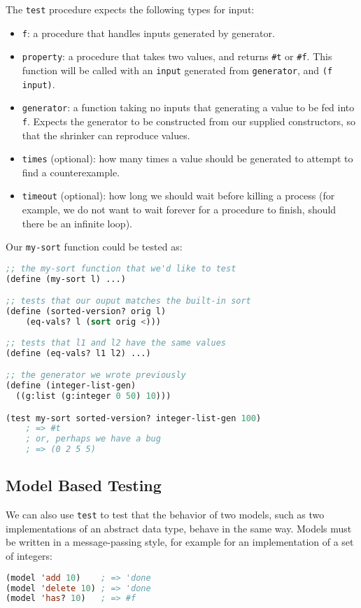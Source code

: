 The \verb|test| procedure expects the following types for input:
\begin{itemize}
	\item \verb|f|: a procedure that handles inputs generated by generator.
	\item \verb|property|: a procedure that takes two values, and returns \verb|#t| or \verb|#f|. This function will be called with an \verb|input| generated from \verb|generator|, and \verb|(f input)|.
	\item \verb|generator|: a function taking no inputs that generating a value to be fed into \verb|f|. Expects the generator to be constructed from our supplied constructors, so that the shrinker can reproduce values.
	\item \verb|times| (optional): how many times a value should be generated to attempt to find a counterexample.
	\item \verb|timeout| (optional): how long we should wait before killing a process (for example, we do not want to wait forever for a procedure to finish, should there be an infinite loop).
\end{itemize}

Our \verb|my-sort| function could be tested as:

\begin{lstlisting}[language=lisp]
;; the my-sort function that we'd like to test
(define (my-sort l) ...)          

;; tests that our ouput matches the built-in sort
(define (sorted-version? orig l) 
    (eq-vals? l (sort orig <)))   
    
;; tests that l1 and l2 have the same values
(define (eq-vals? l1 l2) ...)    

;; the generator we wrote previously
(define (integer-list-gen)
  ((g:list (g:integer 0 50) 10)))

(test my-sort sorted-version? integer-list-gen 100) 
    ; => #t
    ; or, perhaps we have a bug
    ; => (0 2 5 5)
\end{lstlisting}

\subsection{Model Based Testing}

We can also use \verb|test| to test that the behavior of two models, such as two implementations of an abstract data type, behave in the same way. Models must be written in a message-passing style, for example for an implementation of a set of integers:
\begin{lstlisting}[language=lisp]
(model 'add 10)    ; => 'done
(model 'delete 10) ; => 'done
(model 'has? 10)   ; => #f
\end{lstlisting}

